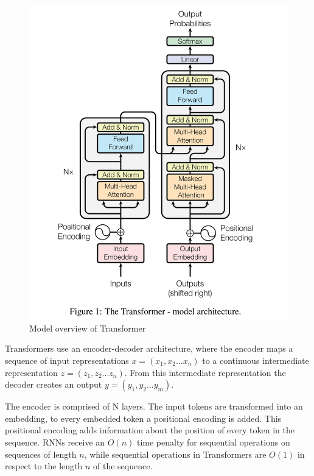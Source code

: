 \label{fig:transformers}
\begin{figure}[H]
  \centering
  \includegraphics[width=\linewidth]{img/transformer.png}
  \caption{Model overview of Transformer \cite{Transformers}}
\end{figure}

Transformers use an encoder-decoder architecture, where the encoder maps a sequence of input representations \(x = (x_1,x_2 ... x_n)\) to a continuous intermediate representation \(z = (z_1,z_2 ... z_n)\). From this intermediate representation the decoder creates an output \(y = (y_1,y_2 ... y_m)\).

The encoder is comprised of N layers. The input tokens are transformed into an embedding, to every embedded token a positional encoding is added. This positional encoding adds information about the position of every token in the sequence. RNNs receive an \(O(n)\) time penalty for sequential operations on sequences of length \(n\), while sequential operations in Transformers are \(O(1)\) in respect to the length \(n\) of the sequence.

